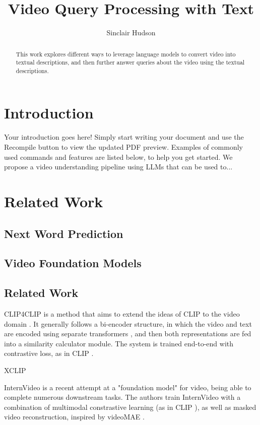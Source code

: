 \documentclass{article}
\title{Video Query Processing with Text}
\author{Sinclair Hudson}
\begin{document}
\maketitle

\begin{abstract}
      This work explores different ways to leverage language models to convert video into textual descriptions, and then further answer queries about the video using the textual descriptions.
\end{abstract}

\section{Introduction}

Your introduction goes here! Simply start writing your document and use the Recompile button to view the updated PDF preview. Examples of commonly used commands and features are listed below, to help you get started.
We propose a video understanding pipeline using LLMs that can be used to...

\section{Related Work}

\subsection{Next Word Prediction}

\subsection{Video Foundation Models}

\subsection{Related Work}


CLIP4CLIP is a method that aims to extend the ideas of CLIP \cite{clip} to the video domain \cite{clip4clip}.
It generally follows a bi-encoder structure, in which the video and text are encoded using separate transformers \cite{transformer}, and then both representations are fed into a similarity calculator module.
The system is trained end-to-end with contrastive loss, as in CLIP \cite{clip}.

XCLIP \cite{xclip}

InternVideo is a recent attempt at a "foundation model" for video, being able to complete numerous downstream tasks.
The authors train InternVideo with a combination of multimodal constrastive learning (as in CLIP \cite{clip}), as well as masked video reconstruction, inspired by videoMAE \cite{videomae}.
\end{document}
